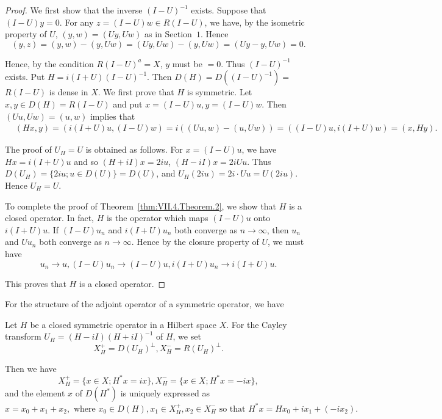 \begin{proof}
 We first show that the inverse $(I-U)^{-1}$ exists. Suppose that $(I-U)y=0$. For any $z=(I-U)w\in R(I-U)$, we have, by the isometric property of $U$, $(y,w)=(Uy,Uw)$ as in Section~\hyperref[sec:VII.1]{$1$}. Hence 
\[
(y, z) = (y, w) - (y, U w) = (U y, U w) - (y, U w) = (U y - y, U w) = 0. \]

Hence, by the condition $R(I - U)^a = X$, $y$ must be $= 0$. Thus $(I - U)^{-1}$ exists. Put $H = i(I + U)(I - U)^{-1}$. Then $D(H) = D((I - U)^{-1}) =$ 
$R(I - U)$ is dense in $X$. We first prove that $H$ is symmetric. Let $x, y \in D(H) = R(I - U)$ and put $x = (I - U)u, y = (I - U)w$. Then $(Uu, Uw) = (u, w)$ implies that 
\[
\begin{aligned}
&(H x, y)  = (i (I + U) u, (I - U) w) = i ((U u, w) - (u, U w)) = ((I - U) u, i (I + U) w) = (x, H y).
\end{aligned}
\]

The proof of $U_H = U$ is obtained as follows. For $x = (I - U)u$, we have $Hx = i(I + U)u$ and so $(H + iI)x = 2iu$, $(H - iI)x = 2iUu$. Thus $D(U_H) = \{2iu; u \in D(U)\} = D(U)$, and $U_H(2iu) = 2i \cdot Uu = U(2iu)$. Hence $U_H = U$. 


To complete the proof of Theorem~\ref{thm:VII.4.Theorem.2}, we show that $H$ is a closed operator. In fact, $H$ is the operator which maps $(I - U) u$ onto $i(I + U) u$. If $(I - U) u_n$ and $i(I + U) u_n$ both converge as $n \to \infty$, then $u_n$ and $U u_n$ both converge as $n \to \infty$. Hence by the closure property of $U$, we must have 
\[
u _{n} \rightarrow u, (I - U) u _{n} \rightarrow (I - U) u, i (I + U) u _{n} \rightarrow i (I + U) u.
\]

This proves that $H$ is a closed operator.
\end{proof}

For the structure of the adjoint operator of a symmetric operator, we have 

\begin{theorem}\label{thm:VII.4.Theorem.3} Let $H$ be a closed symmetric operator in a Hilbert space $X$. For the Cayley transform $U_{H} = (H - iI)(H + iI)^{-1}$ of $H$, we set 
\begin{equation}\label{eq:VII.4.7}
X _{H} ^{+} = D (U _{H}) ^{\perp}, X _{H} ^{-} = R (U _{H}) ^{\perp}.
\end{equation}
\end{theorem}

Then we have 
\begin{equation}\label{eq:VII.4.8}
X _{H} ^{+} = \{x \in X; H ^{*} x = i x \}, X _{H} ^{-} = \{x \in X; H ^{*} x = - i x \},
\end{equation}
and the element $x$ of $D(H^{*})$ is uniquely expressed as 
\begin{equation}x = x _{0} + x _{1} + x _{2}, \text{ where } x _{0} \in D (H), x _{1} \in X _{H} ^{+}, x _{2} \in X _{H} ^{-} \text{ so that } H ^{*} x = H x _{0} + i x _{1} + (- i x _{2}). \label{eq:VII.4.9}\end{equation}

